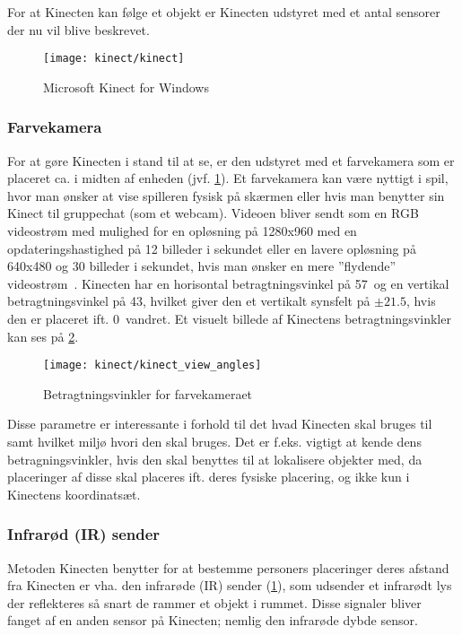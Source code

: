 For at Kinecten kan følge et objekt er Kinecten udstyret med et antal sensorer der nu vil blive beskrevet.

\begin{figure}
\centering
\texttt{[image: kinect/kinect]}
\caption{Microsoft Kinect for Windows}
\label{kinect:opbygning}
\end{figure}

\subsubsection{Farvekamera}\label{kinect:farvekamera}
For at gøre Kinecten i stand til at se, er den udstyret med et farvekamera som er placeret ca. i midten af enheden (jvf. \cref{kinect:opbygning}).
Et farvekamera kan være nyttigt i spil, hvor man ønsker at vise spilleren fysisk på skærmen eller hvis man benytter sin Kinect til gruppechat (som et webcam).
Videoen bliver sendt som en RGB videostrøm med mulighed for en opløsning på 1280x960 med en opdateringshastighed på 12 billeder i sekundet eller en lavere opløsning på 640x480 og 30 billeder i sekundet, hvis man ønsker en mere ”flydende” videostrøm~\cite{kinectForWindowsFeatures}.
Kinecten har en horisontal betragtningsvinkel på 57\degree~og en vertikal betragtningsvinkel på 43\degree, hvilket giver den et vertikalt synsfelt på $\pm 21.5$\degree, hvis den er placeret ift. 0\degree~vandret.
Et visuelt billede af Kinectens betragtningsvinkler kan ses på \cref{kinect:vinkler}.

\begin{figure}
\centering
\texttt{[image: kinect/kinect\_view\_angles]}
\caption{Betragtningsvinkler for farvekameraet}
\label{kinect:vinkler}
\end{figure}

Disse parametre er interessante i forhold til det hvad Kinecten skal bruges til samt hvilket miljø hvori den skal bruges. Det er f.eks. vigtigt at kende dens betragningsvinkler, hvis den skal benyttes til at lokalisere objekter med, da placeringer af disse skal placeres ift. deres fysiske placering, og ikke kun i Kinectens koordinatsæt.

\subsubsection{Infrarød (IR) sender}
Metoden Kinecten benytter for at bestemme personers placeringer deres afstand fra Kinecten er vha. den infrarøde (IR) sender (\cref{kinect:opbygning}), som udsender et infrarødt lys der reflekteres så snart de rammer et objekt i rummet. 
Disse signaler bliver fanget af en anden sensor på Kinecten; nemlig den infrarøde dybde sensor.

